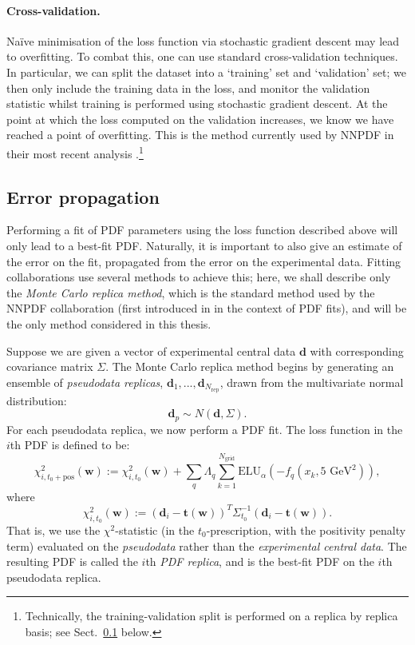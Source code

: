 \documentclass[withindex,glossary]{cam-thesis}
\renewcommand{\vec}[1]{\textbf{#1}} %
\begin{document}
\paragraph{Cross-validation.} Na\"{i}ve minimisation of the loss function via stochastic gradient descent may lead to overfitting. To combat this, one can use standard cross-validation techniques. In particular, we can split the dataset into a `training' set and `validation' set; we then only include the training data in the loss, and monitor the validation statistic whilst training is performed using stochastic gradient descent. At the point at which the loss computed on the validation increases, we know we have reached a point of overfitting. This is the method currently used by NNPDF in their most recent analysis \cite{NNPDF:2021njg}.\footnote{Technically, the training-validation split is performed on a replica by replica basis; see Sect.~\ref{sec:pdf_error_propagation} below.}

\subsection{Error propagation}
\label{sec:pdf_error_propagation}
Performing a fit of PDF parameters using the loss function described above will only lead to a best-fit PDF. Naturally, it is important to also give an estimate of the error on the fit, propagated from the error on the experimental data. Fitting collaborations use several methods to achieve this; here, we shall describe only the \textit{Monte Carlo replica method}, which is the standard method used by the NNPDF collaboration (first introduced in \cite{DelDebbio:2004xtd} in the context of PDF fits), and will be the only method considered in this thesis.

Suppose we are given a vector of experimental central data $\vec{d}$ with corresponding covariance matrix $\Sigma$. The Monte Carlo replica method begins by generating an ensemble of \textit{pseudodata replicas}, $\vec{d}_1, ..., \vec{d}_{N_{\text{rep}}}$, drawn from the multivariate normal distribution:
\begin{equation}
\vec{d}_p \sim N(\vec{d}, \Sigma).
\end{equation}
For each pseudodata replica, we now perform a PDF fit. The loss function in the $i$th PDF is defined to be:
\begin{equation}
\chi^2_{i, t_0 + \text{pos}}(\vec{w}) := \chi^2_{i,t_0}(\vec{w}) + \sum_{q} \Lambda_q \sum_{k=1}^{N_{\text{grid}}} \textrm{ELU}_{\alpha}\left( - f_q(x_k, 5 \text{ GeV}^2) \right),
\end{equation}
where
\begin{equation}
\chi^2_{i,t_0}(\vec{w}) := (\vec{d}_i - \vec{t}(\vec{w}))^T \Sigma_{t_0}^{-1} (\vec{d}_ i - \vec{t}(\vec{w})).
\end{equation}
That is, we use the $\chi^2$-statistic (in the $t_0$-prescription, with the positivity penalty term) evaluated on the \textit{pseudodata} rather than the \textit{experimental central data}. The resulting PDF is called the $i$th \textit{PDF replica}, and is the best-fit PDF on the $i$th pseudodata replica. 
\end{document}
